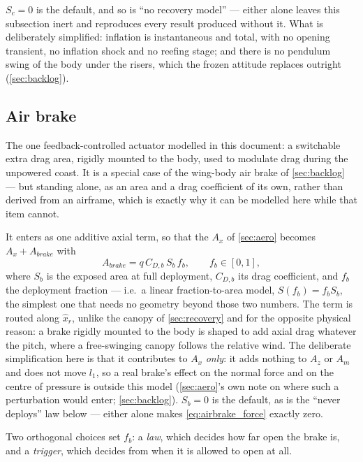 $S_c=0$ is the default, and so is ``no recovery model'' --- either alone leaves this subsection
inert and reproduces every result produced without it. What is deliberately simplified: inflation
is instantaneous and total, with no opening transient, no inflation shock and no reefing stage; and
there is no pendulum swing of the body under the risers, which the frozen attitude replaces
outright (\autoref{sec:backlog}).

\subsection{Air brake}\label{sec:airbrake}
The one feedback-controlled actuator modelled in this document: a switchable extra drag area,
rigidly mounted to the body, used to modulate drag during the unpowered coast. It is a special case
of the wing-body air brake of \autoref{sec:backlog} --- but standing alone, as an area and a drag
coefficient of its own, rather than derived from an airframe, which is exactly why it can be
modelled here while that item cannot.

It enters as one additive axial term, so that the $A_x$ of \autoref{sec:aero} becomes
$A_x+A_{brake}$ with
\begin{equation} \label{eq:airbrake_force}
    A_{brake} = q\,C_{D,b}\,S_b\,f_b, \qquad f_b\in[0,1],
\end{equation}
where $S_b$ is the exposed area at full deployment, $C_{D,b}$ its drag coefficient, and $f_b$ the
deployment fraction --- i.e.\ a linear fraction-to-area model, $S(f_b)=f_bS_b$, the simplest one
that needs no geometry beyond those two numbers. The term is routed along $\hat{x}_r$, unlike the
canopy of \autoref{sec:recovery} and for the opposite physical reason: a brake rigidly mounted to
the body is shaped to add axial drag whatever the pitch, where a free-swinging canopy follows the
relative wind. The deliberate simplification here is that it contributes to $A_x$ \emph{only}: it
adds nothing to $A_z$ or $A_m$ and does not move $l_1$, so a real brake's effect on the normal
force and on the centre of pressure is outside this model (\autoref{sec:aero}'s own note on where
such a perturbation would enter; \autoref{sec:backlog}). $S_b=0$ is the default, as is the ``never
deploys'' law below --- either alone makes \autoref{eq:airbrake_force} exactly zero.

Two orthogonal choices set $f_b$: a \emph{law}, which decides how far open the brake is, and a
\emph{trigger}, which decides from when it is allowed to open at all.

